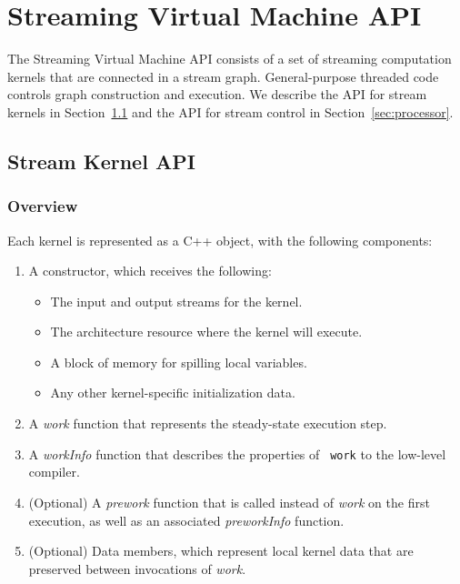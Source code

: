 \section{Streaming Virtual Machine API}

The Streaming Virtual Machine API consists of a set of streaming
computation kernels that are connected in a stream graph.
General-purpose threaded code controls graph construction and
execution.  We describe the API for stream kernels in
Section~\ref{sec:kernel} and the API for stream control in
Section~\ref{sec:processor}.

\subsection{Stream Kernel API}
\label{sec:kernel}

\subsubsection{Overview}

Each kernel is represented as a C++ object, with the following
components:

\begin{enumerate}

\item A constructor, which receives the following:

\begin{itemize}
\item The input and output streams for the kernel.
\item The architecture resource where the kernel will execute.
\item A block of memory for spilling local variables.
\item Any other kernel-specific initialization data.
\end{itemize}

\item A {\it work} function that represents the steady-state execution
step.

\item A {\it workInfo} function that describes the properties of {\tt
work} to the low-level compiler.

\item (Optional) A {\it prework} function that is called instead of
{\it work} on the first execution, as well as an associated {\it
preworkInfo} function.

\item (Optional) Data members, which represent local kernel data that
are preserved between invocations of {\it work}.

\end{enumerate}

